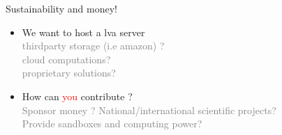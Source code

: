 \documentclass{beamer}
\begin{document}
\begin{frame}{Sustainability and money!}


  \begin{itemize}

\item We want to host a lva server\\
\textcolor{gray}{thirdparty storage (i.e amazon) ?\\cloud computations?\\proprietary solutions?}\\
\item How can \textcolor{red}{you} contribute ?\\
\textcolor{gray}{Sponsor money ? National/international scientific projects?\\Provide sandboxes and computing power?}

\end{itemize}


\end{frame}







\end{document}
